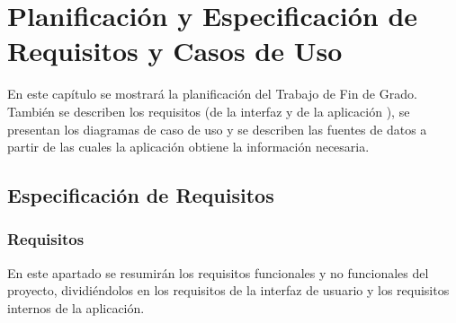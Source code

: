 \chapter{Planificación y Especificación de Requisitos y Casos de Uso}
En este capítulo se mostrará la planificación del Trabajo de Fin de Grado. También se describen los requisitos (de la interfaz y de la aplicación ), se presentan los diagramas de caso de uso y se describen	las fuentes de datos a partir de las cuales la aplicación obtiene la información necesaria.


\section{Especificación de  Requisitos}
\subsection[Requisitos]{Requisitos}
En este apartado se resumirán los requisitos funcionales y no funcionales del proyecto, dividiéndolos en los requisitos de la interfaz de usuario y los requisitos internos de la aplicación.
